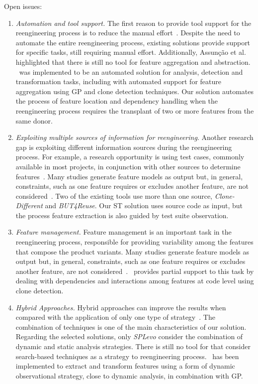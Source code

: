 Open issues:

\begin{enumerate}
    \item \emph{Automation and tool support.} The first reason to provide tool support for the reengineering process is to reduce the manual effort~\cite{Martinez2014, Abbasi2014}. Despite the need to automate the entire reengineering process, existing solutions provide support for specific tasks, still requiring manual effort. Additionally, Assunção et al.~\cite{Assuncao2017} highlighted that there is still no tool for feature aggregation and abstraction. \autoscalpel~was implemented to be an automated solution for analysis, detection and transformation tasks, including with automated support for feature aggregation using GP and clone detection techniques. Our solution automates the process of feature location and dependency handling when the reengineering process requires the transplant of two or more features from the same donor.
    
    \item \emph{Exploiting multiple sources of information for reengineering}. Another research gap is exploiting different information sources during the reengineering process. For example, a research opportunity is using test cases, commonly available in most projects, in conjunction with other sources to determine features~\cite{Knodel2005}. Many studies generate feature models as output but, in general, constraints, such as one feature requires or excludes another feature, are not considered~\cite{Assuncao2017}.  Two of the existing tools use more than one source, \emph{Clone-Different} and \emph{BUT4Reuse}. Our ST solution uses source code as input, but the process feature extraction is also guided by test suite observation.
    
    \item \emph{Feature  management.} Feature management is an important task in the reengineering process, responsible for providing variability among the features that compose the product variants. Many studies generate feature models as output but, in general, constraints, such as one feature requires or excludes another feature, are not considered~\cite{Assuncao2017}. \autoscalpel~provides partial support to this task by dealing with dependencies and interactions among features at code level using clone detection.
    
    \item \emph{Hybrid Approaches.} Hybrid approaches can improve the results when compared with the application of only one type of strategy~\cite{Assuncao2017}. The combination of techniques is one of the main characteristics of our solution. Regarding the selected solutions, only \emph{SPLevo} consider the combination of dynamic and static analysis strategies. There is still no tool for that consider search-based techniques as a strategy to reengineering process. \autoscalpel~has been implemented to extract and transform features using a form of dynamic observational strategy, close to dynamic analysis, in combination with GP. 
    

\end{enumerate}
